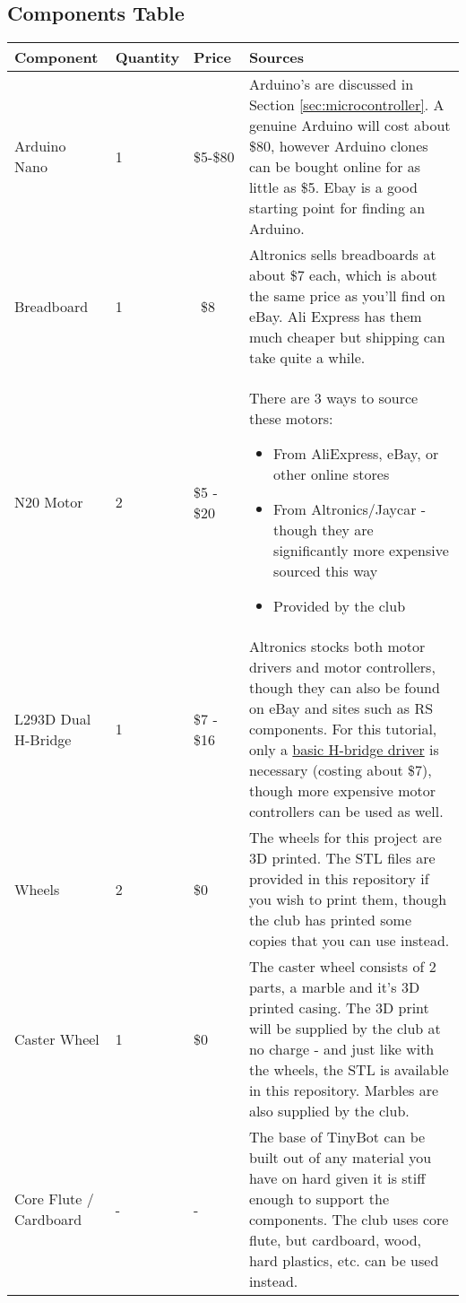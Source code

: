 \documentclass[../TinyBot.tex]{subfiles}
\begin{document}
\begin{landscape}

\section{Components Table}
    \begin{tabularx}{\linewidth}{p{} p{} p{} X}
        \toprule
        Component & Quantity & Price & Sources \\ \midrule
        Arduino Nano & 1 & \$5-\$80 & Arduino's are discussed in Section \ref{sec:microcontroller}. A genuine Arduino will cost about \$80, however Arduino clones can be bought online for as little as \$5. Ebay is a good starting point for finding an Arduino.  \\
        Breadboard & 1 & ~\$8& Altronics sells breadboards at about \$7 each, which is about the same price as you'll find on eBay. Ali Express has them much cheaper but shipping can take quite a while. \\[2cm]
        N20 Motor & 2 & \$5 - \$20 & There are 3 ways to source these motors: \begin{itemize}
            \item From AliExpress, eBay, or other online stores
            \item From Altronics/Jaycar - though they are significantly more expensive sourced this way
            \item Provided by the club
        \end{itemize} \\
        L293D Dual H-Bridge & 1 & \$7 - \$16&   Altronics stocks both motor drivers and motor controllers, though they can also be found on eBay and sites such as RS components. For this tutorial, only a \href{https://www.altronics.com.au/p/z2900-l293d-motor-drive-ic/}{basic H-bridge driver} is necessary (costing about \$7), though more expensive motor controllers can be used as well. \\[1cm]
        
        Wheels & 2& \$0 & The wheels for this project are 3D printed. The STL files are provided in this repository if you wish to print them, though the club has printed some copies that you can use instead. \\[1cm]
        Caster Wheel & 1 & \$0 & The caster wheel consists of 2 parts, a marble and it's 3D printed casing. The 3D print will be supplied by the club at no charge - and just like with the wheels, the STL is available in this repository. Marbles are also supplied by the club. \\[1cm]
        
        Core Flute / Cardboard & - & - & The base of TinyBot can be built out of any material you have on hard given it is stiff enough to support the components. The club uses core flute, but cardboard, wood, hard plastics, etc. can be used instead.\\[1cm]
        \bottomrule
    \end{tabularx}

\end{landscape}
\end{document}
